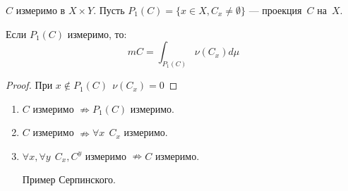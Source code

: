 \begin{corollary}
    \(C\) измеримо в \(X \times Y\). Пусть \(P_1(C) = \{x\in X, C_x \neq \emptyset\}\) --- проекция~\(C\) на~\(X\).

    Если \(P_1(C)\) измеримо, то:
    \[mC = \int_{P_1(C)} \nu(C_x) d\mu\]
\end{corollary}
\begin{proof}
    При \(x\not\in P_1(C) \ \ \nu(C_x) = 0\)
\end{proof}

\begin{remark}\itemfix
    \begin{enumerate}
        \item \(C\) измеримо \(\nRightarrow P_1(C)\) измеримо.
        \item \(C\) измеримо \(\nRightarrow \forall x \ \ C_x\) измеримо.
        \item \(\forall x, \forall y \ \ C_x, C^y\) измеримо \(\nRightarrow C\) измеримо.

              Пример Серпинского.
    \end{enumerate}
\end{remark}
